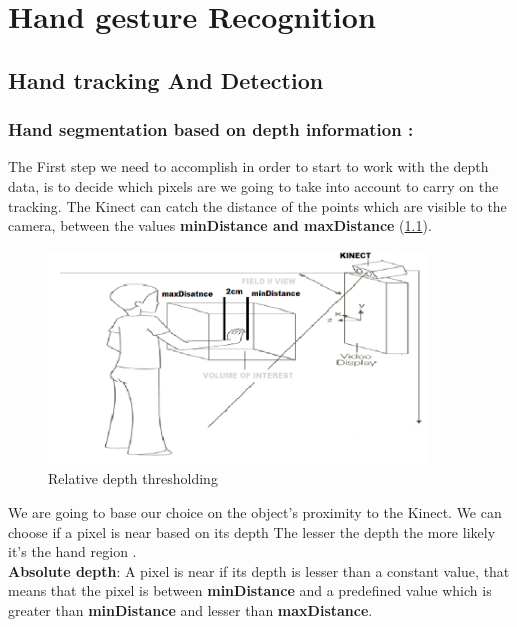 
\chapter{Hand gesture Recognition} \label{hgr}




\section{Hand tracking  And Detection}

\subsection{Hand segmentation based on depth information :} \label{depth}

The First step we need to accomplish in order to start to work with the depth data, is to decide which pixels are we going to take into account to carry on the tracking. The Kinect can catch the distance of the points which are visible to the camera, between the values \textbf{minDistance and maxDistance} (\ref{fig:cam8}).

\begin{figure}[H]
\centering
\includegraphics[width=0.9\textwidth]{img/mindistance.png}
\caption{Relative depth thresholding }
\label{fig:cam8}
\end{figure}

We are going to base our choice on the object’s proximity to the Kinect. We can choose if a pixel is near based on its depth  The lesser the depth the more likely it’s the hand region .\\

\textbf{ Absolute depth}: A pixel is near if its depth is lesser than a constant value, that means that the pixel is between \textbf{minDistance }and a predeﬁned value which is greater than \textbf{minDistance }and lesser than \textbf{maxDistance}.\\

